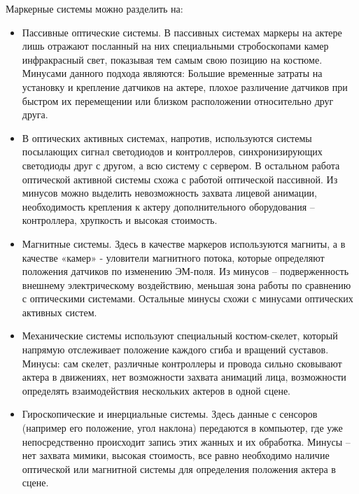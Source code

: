 Маркерные системы можно разделить на:
\begin{itemize}
	\item Пассивные оптические системы. В пассивных системах маркеры на актере лишь отражают посланный на них специальными стробоскопами камер инфракрасный свет, показывая тем самым свою позицию на костюме. Минусами данного подхода являются: Большие временные затраты на установку и крепление датчиков на актере, плохое различение датчиков при быстром их перемещении или близком расположении относительно друг друга.
	\item В оптических активных системах, напротив, используются системы посылающих сигнал светодиодов и контроллеров, синхронизирующих светодиоды друг с другом, а всю систему с сервером. В остальном работа оптической активной системы схожа с работой оптической пассивной. Из минусов можно выделить невозможность захвата лицевой анимации, необходимость крепления к актеру дополнительного оборудования – контроллера, хрупкость и высокая стоимость.
	\item Магнитные системы. Здесь в качестве маркеров используются магниты, а в качестве «камер» - уловители магнитного потока, которые определяют положения датчиков по изменению ЭМ-поля. Из минусов – подверженность внешнему электрическому воздействию, меньшая зона работы по сравнению с оптическими системами. Остальные минусы схожи с минусами оптических активных систем.
	\item Механические системы используют специальный костюм-скелет, который напрямую отслеживает положение каждого сгиба и вращений суставов. Минусы: сам скелет, различные контроллеры и провода сильно сковывают актера в движениях, нет возможности захвата анимаций лица, возможности определять взаимодействия нескольких актеров в одной сцене.
	\item Гироскопические и инерциальные системы. Здесь данные с сенсоров (например его положение, угол наклона) передаются в компьютер, где уже непосредственно происходит запись этих жанных и их обработка. Минусы – нет захвата мимики, высокая стоимость, все равно необходимо наличие оптической или магнитной системы для определения положения актера в сцене.
\end{itemize}

